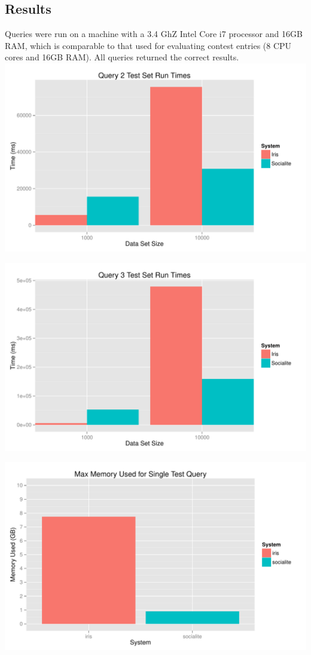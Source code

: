 \documentclass{article}
\begin{document}
\begin{multicols}{2}
\section{Results}
Queries were run on a machine with a 3.4 GhZ Intel Core i7 processor and 16GB RAM, which is comparable to that used for evaluating contest entries (8 CPU cores and 16GB RAM). All queries returned the correct results.
\begingroup
    \centering
    \includegraphics[scale=0.4]{../results/query2.pdf}
    \label{fig:q2}
\endgroup

\begingroup
    \centering
    \includegraphics[scale=0.4]{../results/query3.pdf}
    \label{fig:q3}
\endgroup

\begingroup
    \centering
    \includegraphics[scale=0.4]{../results/memory.pdf}
    \label{fig:memory}
\endgroup

\end{multicols}
\end{document}
